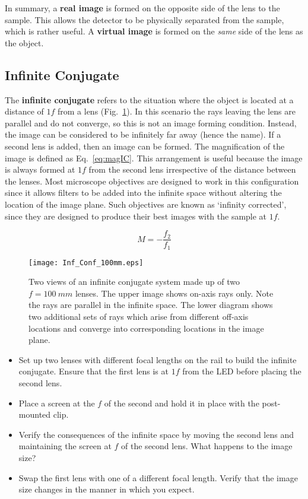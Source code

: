 \documentclass[a4paper]{report}
\begin{document}
	In summary, a \textbf{real image} is formed on the opposite side of the lens to the sample. 
	This allows the detector to be physically separated from the sample, which is rather useful.
	A \textbf{virtual image} is formed on the \textit{same} side of the lens as the object. 
	
	\clearpage
	
	\subsection{Infinite Conjugate}
	The \textbf{infinite conjugate} refers to the situation where the object is located at a distance of $1f$ from a lens (Fig.~\ref{infiniteConjugate}). 
	In this scenario the rays leaving the lens are parallel and do not converge, so this is not an image forming condition. 
	Instead, the image can be considered to be infinitely far away (hence the name). 
	If a second lens is added, then an image can be formed. 
	The magnification of the image is defined as Eq.~\ref{eq:magIC}. 
	This arrangement is useful because the image is always formed at $1f$ from the second lens irrespective of the distance between the lenses.
	Most microscope objectives are designed to work in this configuration since it allows filters to be added into the infinite space without altering the location of the image plane. 
	Such objectives are known as `infinity corrected', since they are designed to produce their best images with the sample at $1f$.
	
	\begin{equation}
	M=-\frac{f_2}{f_1}
	\label{eq:magIC}
	\end{equation}
	
	\begin{figure}[h]
		\center
		\texttt{[image: Inf\_Conf\_100mm.eps]}
		\caption{Two views of an infinite conjugate system made up of two $f=100~mm$ lenses. 
			The upper image shows on-axis rays only. 
			Note the rays are parallel in the infinite space.
			The lower diagram shows two additional sets of rays which arise from different off-axis locations and converge into corresponding locations in the image plane. }
		\label{infiniteConjugate}
	\end{figure}
	
	\begin{itemize}
		\item Set up two lenses with different focal lengths on the rail to build the infinite conjugate. 
		Ensure that the first lens is at $1f$ from the LED before placing the second lens. 
		\item Place a screen at the $f$ of the second and hold it in place with the post-mounted clip.
		\item Verify the consequences of the infinite space by moving the second lens and maintaining the screen at $f$ of the second lens. 
		What happens to the image size?
		\item Swap the first lens with one of a different focal length. 
		Verify that the image size changes in the manner in which you expect. 
	\end{itemize}
	
\end{document}
